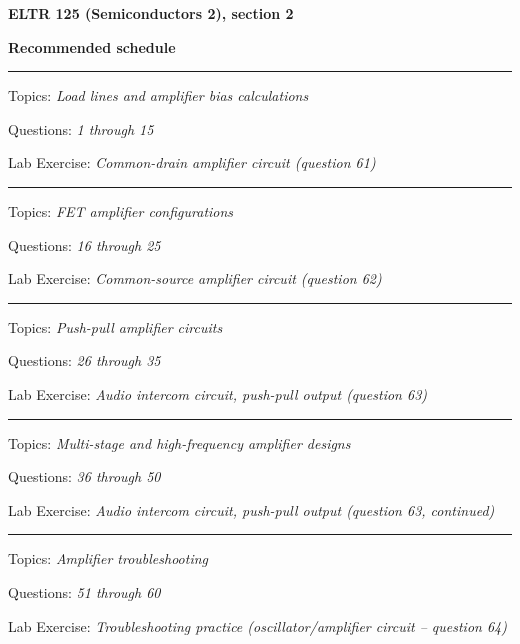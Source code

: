 
\centerline{\bf ELTR 125 (Semiconductors 2), section 2} \bigskip 
 
\vskip 10pt

\noindent
{\bf Recommended schedule}

\vskip 5pt

\hrule \vskip 5pt
\noindent
{}

\hskip 10pt Topics: {\it Load lines and amplifier bias calculations}
 
\hskip 10pt Questions: {\it 1 through 15}
 
\hskip 10pt Lab Exercise: {\it Common-drain amplifier circuit (question 61)}
 
\vskip 10pt
\hrule \vskip 5pt
\noindent
{}

\hskip 10pt Topics: {\it FET amplifier configurations}
 
\hskip 10pt Questions: {\it 16 through 25}
 
\hskip 10pt Lab Exercise: {\it Common-source amplifier circuit (question 62)}
 
 
\vskip 10pt
\hrule \vskip 5pt
\noindent
{}

\hskip 10pt Topics: {\it Push-pull amplifier circuits}
 
\hskip 10pt Questions: {\it 26 through 35}
 
\hskip 10pt Lab Exercise: {\it Audio intercom circuit, push-pull output (question 63)}
 

\vskip 10pt
\hrule \vskip 5pt
\noindent
{}

\hskip 10pt Topics: {\it Multi-stage and high-frequency amplifier designs}
 
\hskip 10pt Questions: {\it 36 through 50}
 
\hskip 10pt Lab Exercise: {\it Audio intercom circuit, push-pull output (question 63, continued)}
 
\vskip 10pt
\hrule \vskip 5pt
\noindent
{}

\hskip 10pt Topics: {\it Amplifier troubleshooting}
 
\hskip 10pt Questions: {\it 51 through 60}
 
\hskip 10pt Lab Exercise: {\it Troubleshooting practice (oscillator/amplifier circuit -- question 64)}

